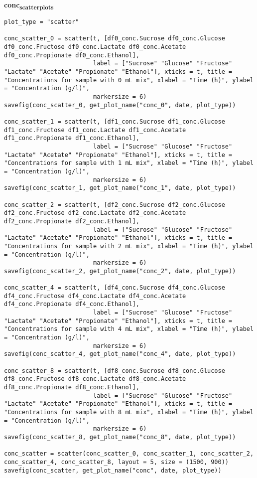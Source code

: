 \documentclass[11pt]{article}
\begin{document}
\textbf{conc\textsubscript{scatter}\textsubscript{plots}}
\begin{verbatim}
plot_type = "scatter"

conc_scatter_0 = scatter(t, [df0_conc.Sucrose df0_conc.Glucose df0_conc.Fructose df0_conc.Lactate df0_conc.Acetate df0_conc.Propionate df0_conc.Ethanol],
                         label = ["Sucrose" "Glucose" "Fructose" "Lactate" "Acetate" "Propionate" "Ethanol"], xticks = t, title = "Concentrations for sample with 0 mL mix", xlabel = "Time (h)", ylabel = "Concentration (g/l)",
                         markersize = 6)
savefig(conc_scatter_0, get_plot_name("conc_0", date, plot_type))

conc_scatter_1 = scatter(t, [df1_conc.Sucrose df1_conc.Glucose df1_conc.Fructose df1_conc.Lactate df1_conc.Acetate df1_conc.Propionate df1_conc.Ethanol],
                         label = ["Sucrose" "Glucose" "Fructose" "Lactate" "Acetate" "Propionate" "Ethanol"], xticks = t, title = "Concentrations for sample with 1 mL mix", xlabel = "Time (h)", ylabel = "Concentration (g/l)",
                         markersize = 6)
savefig(conc_scatter_1, get_plot_name("conc_1", date, plot_type))

conc_scatter_2 = scatter(t, [df2_conc.Sucrose df2_conc.Glucose df2_conc.Fructose df2_conc.Lactate df2_conc.Acetate df2_conc.Propionate df2_conc.Ethanol],
                         label = ["Sucrose" "Glucose" "Fructose" "Lactate" "Acetate" "Propionate" "Ethanol"], xticks = t, title = "Concentrations for sample with 2 mL mix", xlabel = "Time (h)", ylabel = "Concentration (g/l)",
                         markersize = 6)
savefig(conc_scatter_2, get_plot_name("conc_2", date, plot_type))

conc_scatter_4 = scatter(t, [df4_conc.Sucrose df4_conc.Glucose df4_conc.Fructose df4_conc.Lactate df4_conc.Acetate df4_conc.Propionate df4_conc.Ethanol],
                         label = ["Sucrose" "Glucose" "Fructose" "Lactate" "Acetate" "Propionate" "Ethanol"], xticks = t, title = "Concentrations for sample with 4 mL mix", xlabel = "Time (h)", ylabel = "Concentration (g/l)",
                         markersize = 6)
savefig(conc_scatter_4, get_plot_name("conc_4", date, plot_type))

conc_scatter_8 = scatter(t, [df8_conc.Sucrose df8_conc.Glucose df8_conc.Fructose df8_conc.Lactate df8_conc.Acetate df8_conc.Propionate df8_conc.Ethanol],
                         label = ["Sucrose" "Glucose" "Fructose" "Lactate" "Acetate" "Propionate" "Ethanol"], xticks = t, title = "Concentrations for sample with 8 mL mix", xlabel = "Time (h)", ylabel = "Concentration (g/l)",
                         markersize = 6)
savefig(conc_scatter_8, get_plot_name("conc_8", date, plot_type))

conc_scatter = scatter(conc_scatter_0, conc_scatter_1, conc_scatter_2, conc_scatter_4, conc_scatter_8, layout = 5, size = (1500, 900))
savefig(conc_scatter, get_plot_name("conc", date, plot_type))

\end{verbatim}
\end{document}
